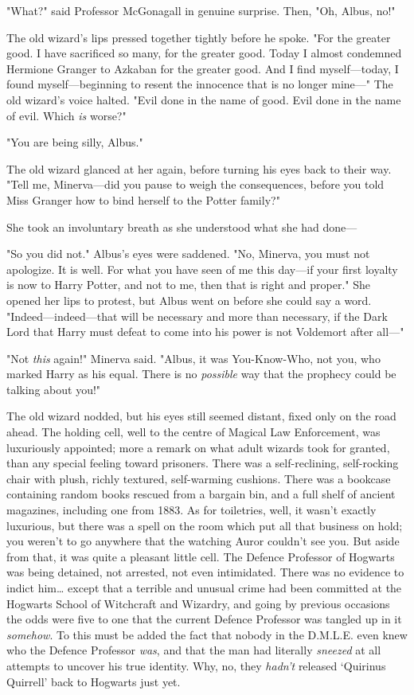 "What?" said Professor McGonagall in genuine surprise. Then, "Oh, Albus, no!"

The old wizard's lips pressed together tightly before he spoke. "For the
greater good. I have sacrificed so many, for the greater good. Today I almost
condemned Hermione Granger to Azkaban for the greater good. And I find
myself---today, I found myself---beginning to resent the innocence that is no
longer mine---" The old wizard's voice halted. "Evil done in the name of good.
Evil done in the name of evil. Which \emph{is} worse?"

"You are being silly, Albus."

The old wizard glanced at her again, before turning his eyes back to their way.
"Tell me, Minerva---did you pause to weigh the consequences, before you told
Miss Granger how to bind herself to the Potter family?"

She took an involuntary breath as she understood what she had done---

"So you did not." Albus's eyes were saddened. "No, Minerva, you must not
apologize. It is well. For what you have seen of me this day---if your first
loyalty is now to Harry Potter, and not to me, then that is right and proper."
She opened her lips to protest, but Albus went on before she could say a word.
"Indeed---indeed---that will be necessary and more than necessary, if the Dark
Lord that Harry must defeat to come into his power is not Voldemort after
all---"

"Not \emph{this} again!" Minerva said. "Albus, it was You-Know-Who, not you,
who marked Harry as his equal. There is no \emph{possible} way that the
prophecy could be talking about you!"

The old wizard nodded, but his eyes still seemed distant, fixed only on the
road ahead.
\later
The holding cell, well to the centre of Magical Law Enforcement, was
luxuriously appointed; more a remark on what adult wizards took for granted,
than any special feeling toward prisoners. There was a self-reclining,
self-rocking chair with plush, richly textured, self-warming cushions. There
was a bookcase containing random books rescued from a bargain bin, and a full
shelf of ancient magazines, including one from 1883. As for toiletries, well,
it wasn't exactly luxurious, but there was a spell on the room which put all
that business on hold; you weren't to go anywhere that the watching Auror
couldn't see you. But aside from that, it was quite a pleasant little cell. The
Defence Professor of Hogwarts was being detained, not arrested, not even
intimidated. There was no evidence to indict him{\ldots} except that a terrible
and unusual crime had been committed at the Hogwarts School of Witchcraft and
Wizardry, and going by previous occasions the odds were five to one that the
current Defence Professor was tangled up in it \emph{somehow}. To this must be
added the fact that nobody in the D.M.L.E. even knew who the Defence Professor
\emph{was}, and that the man had literally \emph{sneezed} at all attempts to
uncover his true identity. Why, no, they \emph{hadn't} released `Quirinus
Quirrell' back to Hogwarts just yet.

